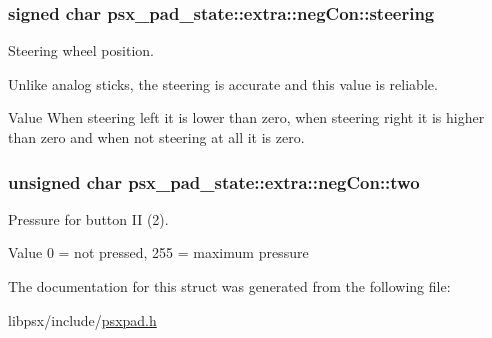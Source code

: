 \subsubsection[{steering}]{\setlength{\rightskip}{0pt plus 5cm}signed char psx\+\_\+pad\+\_\+state\+::extra\+::neg\+Con\+::steering}\label{structpsx__pad__state_1_1extra_1_1negCon_a2b80fffb7562cb5e49a27b39abf6d801}


Steering wheel position. 

Unlike analog sticks, the steering is accurate and this value is reliable.

\begin{DoxyParagraph}{Value}
When steering left it is lower than zero, when steering right it is higher than zero and when not steering at all it is zero. 
\end{DoxyParagraph}
\hypertarget{structpsx__pad__state_1_1extra_1_1negCon_a10c325e774816864fcff176eeb29ba41}{}
\subsubsection[{two}]{\setlength{\rightskip}{0pt plus 5cm}unsigned char psx\+\_\+pad\+\_\+state\+::extra\+::neg\+Con\+::two}\label{structpsx__pad__state_1_1extra_1_1negCon_a10c325e774816864fcff176eeb29ba41}


Pressure for button I\+I (2). 

\begin{DoxyParagraph}{Value }
0 = not pressed, 255 = maximum pressure 
\end{DoxyParagraph}


The documentation for this struct was generated from the following file\+:\begin{DoxyCompactItemize}
\item 
libpsx/include/\hyperlink{psxpad_8h}{psxpad.\+h}\end{DoxyCompactItemize}
